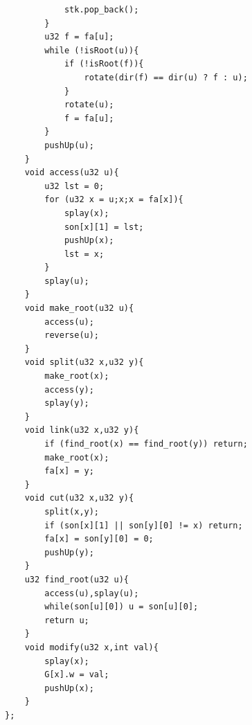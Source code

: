 \begin{lstlisting}
            stk.pop_back();
        }
        u32 f = fa[u];
        while (!isRoot(u)){
            if (!isRoot(f)){
                rotate(dir(f) == dir(u) ? f : u);
            }
            rotate(u);
            f = fa[u];
        }
        pushUp(u);
    }
    void access(u32 u){
        u32 lst = 0;
        for (u32 x = u;x;x = fa[x]){
            splay(x);
            son[x][1] = lst;
            pushUp(x);
            lst = x;
        }
        splay(u);
    }
    void make_root(u32 u){
        access(u);
        reverse(u);
    }
    void split(u32 x,u32 y){
        make_root(x);
        access(y);
        splay(y);
    }
    void link(u32 x,u32 y){
        if (find_root(x) == find_root(y)) return;
        make_root(x);
        fa[x] = y;
    }
    void cut(u32 x,u32 y){
        split(x,y);
        if (son[x][1] || son[y][0] != x) return;
        fa[x] = son[y][0] = 0;
        pushUp(y);
    }
    u32 find_root(u32 u){
        access(u),splay(u);
        while(son[u][0]) u = son[u][0];
        return u;
    }
    void modify(u32 x,int val){
        splay(x);
        G[x].w = val;
        pushUp(x);
    }
};
\end{lstlisting}

